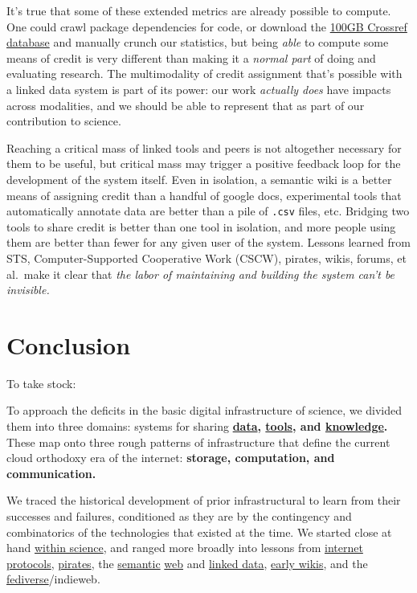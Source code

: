 It's true that some of these extended metrics are already possible to
compute. One could crawl package dependencies for code, or download the
\href{https://academictorrents.com/details/e4287cb7619999709f6e9db5c359dda17e93d515}{100GB
Crossref database} \citep{crossrefJanuary2021Public2021}  and
manually crunch our statistics, but being \emph{able} to compute some
means of credit is very different than making it a \emph{normal part} of
doing and evaluating research. The multimodality of credit assignment
that's possible with a linked data system is part of its power: our work
\emph{actually does} have impacts across modalities, and we should be
able to represent that as part of our contribution to science.

Reaching a critical mass of linked tools and peers is not altogether
necessary for them to be useful, but critical mass may trigger a
positive feedback loop for the development of the system itself. Even in
isolation, a semantic wiki is a better means of assigning credit than a
handful of google docs, experimental tools that automatically annotate
data are better than a pile of \texttt{.csv} files, etc. Bridging two
tools to share credit is better than one tool in isolation, and more
people using them are better than fewer for any given user of the
system. Lessons learned from STS, Computer-Supported Cooperative Work
(CSCW), pirates, wikis, forums, et al.~make it clear that \emph{the
labor of maintaining and building the system can't be invisible.}

\hypertarget{conclusion}{%
\chapter{Conclusion}\label{conclusion}}

To take stock:

To approach the deficits in the basic digital infrastructure of science,
we divided them into three domains: systems for sharing
\textbf{\protect\hyperlink{shared-data}{data},
\protect\hyperlink{shared-tools}{tools}, and
\protect\hyperlink{shared-knowledge}{knowledge}.} These map onto three
rough patterns of infrastructure that define the current cloud orthodoxy
era of the internet: \textbf{storage, computation, and communication.}

We traced the historical development of prior infrastructural to learn
from their successes and failures, conditioned as they are by the
contingency and combinatorics of the technologies that existed at the
time. We started close at hand
\protect\hyperlink{misincentives-in-scientific-software}{within
science}, and ranged more broadly into lessons from
\protect\hyperlink{protocols-not-platforms}{internet protocols},
\protect\hyperlink{archives-need-communities}{pirates}, the
\protect\hyperlink{the-long-now-of-immediacy-vs-idealism}{semantic}
\protect\hyperlink{neatness-vs-scruffiness}{web} and
\protect\hyperlink{folk-federation}{linked data},
\protect\hyperlink{the-wiki-way}{early wikis}, and the
\protect\hyperlink{forums--feeds}{fediverse}/indieweb.

